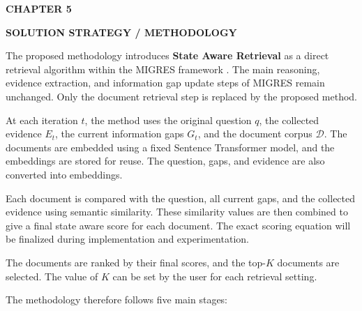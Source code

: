 \documentclass[12pt,a4paper]{report}
\newcommand{\chaptertitle}[2]{
    \begin{center}
        {\fontsize{18}{21}\selectfont\bfseries CHAPTER #1\par}
        \vspace{0.10in}
        {\fontsize{18}{21}\selectfont\bfseries #2\par}
    \end{center}
    \vspace{0.12in}
}
\begin{document}




\setcounter{table}{0}
\renewcommand{\thetable}{5.\arabic{table}}
\setcounter{figure}{0}
\renewcommand{\thefigure}{5.\arabic{figure}}
\setcounter{chapter}{5}
\setcounter{section}{0}
\setcounter{subsection}{0}


\chaptertitle{5}{SOLUTION STRATEGY / METHODOLOGY}

\justifying

The proposed methodology introduces \textbf{State Aware Retrieval} as a direct retrieval algorithm within the MIGRES framework \cite{wang2025migres}. The main reasoning, evidence extraction, and information gap update steps of MIGRES remain unchanged. Only the document retrieval step is replaced by the proposed method.

At each iteration $t$, the method uses the original question $q$, the collected evidence $E_t$, the current information gaps $G_t$, and the document corpus $\mathcal{D}$. The documents are embedded using a fixed Sentence Transformer model, and the embeddings are stored for reuse. The question, gaps, and evidence are also converted into embeddings.

Each document is compared with the question, all current gaps, and the collected evidence using semantic similarity. These similarity values are then combined to give a final state aware score for each document. The exact scoring equation will be finalized during implementation and experimentation.

The documents are ranked by their final scores, and the top-$K$ documents are selected. The value of $K$ can be set by the user for each retrieval setting.

The methodology therefore follows five main stages:
\end{document}
